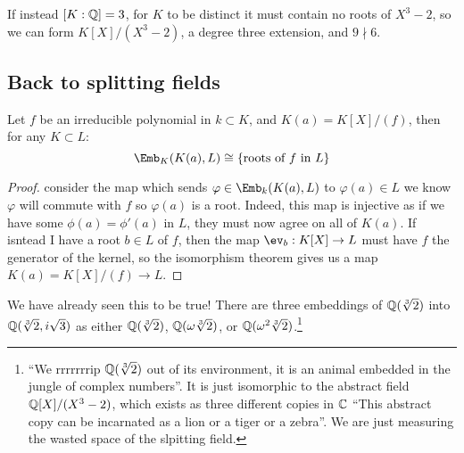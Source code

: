 \documentclass{article}
\begin{document}
If instead $[K:\mathbb{Q}]=3$, for $K$ to be distinct it must contain no roots of $X^3-2$, so we can form $K[X]/(X^3-2)$, a degree three extension, and $9\nmid 6$.

\subsection{Back to splitting fields}

\begin{lemma}
    Let $f$ be an irreducible polynomial in $k\subset K$, and $K(a) = K[X]/(f)$, then for any $K\subset L$:\[
        \Emb_K(K(a),L) \cong \{\text{roots of $f$ in $L$}\}
    \]\begin{proof}
        consider the map which sends $\varphi\in\Emb_k(K(a),L)$ to $\varphi(a)\in L$ we know $\varphi$ will commute with $f$ so $\varphi(a)$ is a root. Indeed, this map is injective as if we have some $\phi(a) = \phi'(a)$ in $L$, they must now agree on all of $K(a)$. If isntead I have a root $b\in L$ of $f$, then the map $\ev_b:K[X]\rightarrow L$ must have $f$ the generator of the kernel, so the isomorphism theorem gives us a map $K(a) = K[X]/(f) \rightarrow L$.
    \end{proof}
\end{lemma}

We have already seen this to be true! There are three embeddings of $\mathbb{Q}(\sqrt[3]{2})$ into $\mathbb{Q}(\sqrt[3]{2},i\sqrt{3})$ as either $\mathbb{Q}(\sqrt[3]{2})$, $\mathbb{Q}(\omega\sqrt[3]{2})$, or $\mathbb{Q}(\omega^2\sqrt[3]{2})$.\footnote{``We rrrrrrrip $\mathbb{Q}(\sqrt[3]{2})$ out of its environment, it is an animal embedded in the jungle of complex numbers''. It is just isomorphic to the abstract field $\mathbb{Q}[X]/(X^3-2)$, which exists as three different copies in $\mathbb{C}$ ``This abstract copy can be incarnated as a lion or a tiger or a zebra''. We are just measuring the wasted space of the slpitting field.}
\end{document}
